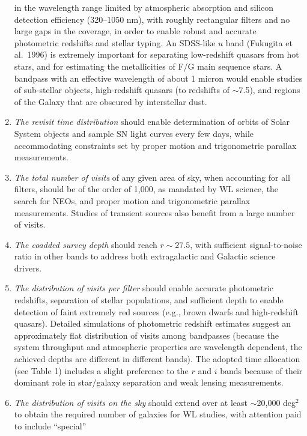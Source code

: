 \documentclass{emulateapj}
\begin{document}
\begin{enumerate}
    in the wavelength range limited by atmospheric absorption and 
    silicon detection efficiency (320--1050 nm), with roughly
    rectangular filters and no large gaps in the coverage, in order
    to enable robust and accurate photometric redshifts and stellar typing. An 
    SDSS-like $u$ band (Fukugita et al.~1996) is extremely important for separating 
    low-redshift quasars from hot stars, and for estimating the metallicities of 
    F/G main sequence stars. A bandpass with an effective wavelength of
    about 1 micron  would enable studies of sub-stellar objects, high-redshift 
    quasars (to redshifts of $\sim$7.5), and regions of the Galaxy that are obscured 
    by interstellar dust.
\item  {\it The revisit time distribution} should enable determination of
   orbits of Solar System objects and sample SN light curves every few days, 
   while accommodating constraints set by proper motion and trigonometric 
   parallax measurements.
\item  {\it The total number of visits} of any given area of sky, when accounting for all 
   filters, should be of the order of 1,000, as mandated by WL
   science, the search for NEOs, and proper motion and 
   trigonometric parallax measurements. Studies of transient sources 
   also benefit from a large number of visits.
\item  {\it The coadded survey depth} should reach 
    $r\sim27.5$, with sufficient signal-to-noise ratio in other bands
    to address both extragalactic and Galactic science drivers.
\item  {\it The distribution of visits per filter} should enable 
   accurate photometric redshifts, separation of stellar populations,
   and sufficient depth to enable detection of faint extremely red
   sources (e.g., brown dwarfs and high-redshift quasars). Detailed simulations of 
   photometric redshift estimates
   suggest an approximately flat distribution of visits among bandpasses
   (because the system throughput and atmospheric properties are 
    wavelength dependent, the achieved depths are different in different
    bands). The adopted time allocation
   (see Table 1) includes a slight preference to the $r$ and $i$ bands because of their
   dominant role in star/galaxy separation and weak lensing measurements. 
\item  {\it The distribution of visits on the sky} should extend over
   at least $\sim$20,000 deg$^2$ to obtain the required number of galaxies
   for WL studies, with attention paid to include ``special''

\end{enumerate}
\end{document}
